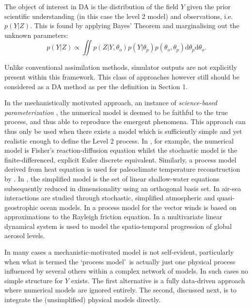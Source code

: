 \documentclass[10pt,a4paper]{article}
\newcommand{\intd} {\textrm{d}}
\begin{document}
\noindent %

The object of interest in DA is the distribution of the field $Y$ given the prior scientific understanding (in this case the level 2 model) and observations, i.e.~$p(Y|Z)$. This is found by applying Bayes' Theorem and marginalising out the unknown parameters:
\begin{equation}
p(Y|Z) \propto \iint p(Z | Y, \theta_o)p(Y | \theta_p)p(\theta_o, \theta_p) \intd \theta_p \intd\theta_o.
\end{equation}

\noindent Unlike conventional assimilation methods, simulator outputs are not explicitly present within this framework. This class of approaches however still should be considered as a DA method as per the definition in Section 1. 

In the mechanistically motivated approach, an instance of \emph{science-based parameterization} \citep{Leeds_2012}, the numerical model is deemed to be faithful to the true process, and thus able to reproduce the emergent phenomena. This approach can thus only be used when there exists a model which is sufficiently simple and yet realistic enough to define the Level 2 process.  In \cite{Hooten_2008}, for example, the numerical model is Fisher's reaction-diffusion equation whilst the stochastic model is the finite-differenced, explicit Euler discrete equivalent. Similarly, a process model derived from heat equation is used for paleoclimate temperature reconstruction by \cite{Brynjarsdottir_2011}. In \cite{Wikle_2001}, the simplified model is the set of linear shallow-water equations subsequently reduced in dimensionality using an orthogonal basis set. In \cite{Berliner_2003b} air-sea interactions are studied through stochastic, simplified atmospheric and quasi-geostrophic ocean models. In \cite{Milliff_2011} a process model for the vector winds is based on approximations to the Rayleigh friction equation. In \cite{Cressie_2010} a multivariate linear dynamical system  is used to model the spatio-temporal progression of global aerosol levels.


In many cases a mechanistic-motivated model is not self-evident, particularly when what is termed the \lq process model\rq~is actually just one physical process influenced by several others within a complex network of models. In such cases no simple structure for $Y$ exists. The first alternative is a fully data-driven approach where numerical models are ignored entirely. The second, discussed next, is to integrate the (unsimplified) physical models directly.
\end{document}
